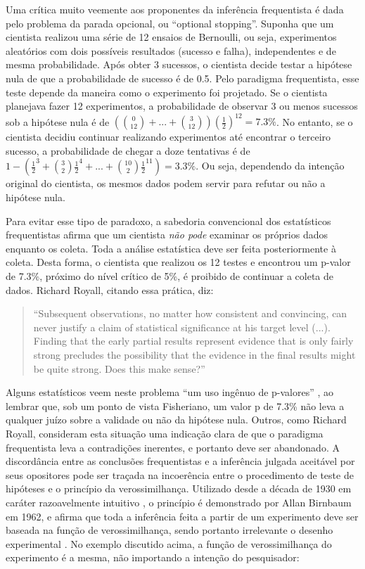 Uma crítica muito veemente aos proponentes da inferência frequentista é dada pelo problema da parada opcional, ou 
``optional stopping''. Suponha que um cientista realizou uma série de 12 ensaios de Bernoulli, ou seja, experimentos aleatórios
com dois possíveis resultados (sucesso e falha), independentes e de mesma probabilidade. Após obter 3 sucessos, o cientista
decide testar a hipótese nula de que a probabilidade de sucesso é de 0.5. Pelo paradigma frequentista, esse teste depende
da maneira como o experimento foi projetado. Se o cientista planejava fazer 12 experimentos, a probabilidade de observar 3
ou menos sucessos sob a hipótese nula é de $ \left( {0 \choose 12} + ... + {3 \choose 12}\right) (\frac{1}{2})^{12} = 7.3\%$. 
No entanto, se o cientista decidiu continuar realizando experimentos até
encontrar o terceiro sucesso, a probabilidade de chegar a doze tentativas é de 
$1 - \left( \frac{1}{2}^3 + {3 \choose 2} \frac{1}{2}^4 + ... + {10 \choose 2} \frac{1}{2}^{11}\right) = 3.3\%$. Ou seja,
dependendo da intenção original do cientista, os mesmos dados podem servir para refutar ou não a hipótese nula.

Para evitar esse tipo de  paradoxo, a sabedoria convencional dos estatísticos frequentistas afirma que um cientista {\em não pode}
examinar os próprios dados enquanto os coleta. Toda a análise estatística deve ser feita posteriormente à coleta. 
Desta forma, o cientista que realizou os 12 testes e encontrou um p-valor de 7.3\%, próximo do nível crítico de 5\%, é
proibido de continuar a coleta de dados. Richard Royall, citando essa prática, diz:

\begin{quote}
``Subsequent observations, no matter how consistent and convincing, can never justify a claim of statistical significance
at his target level (...). Finding that the early partial results represent evidence that is only fairly strong precludes
the possibility that the evidence in the final results might be quite strong. Does this make sense?'' \citep{Royall97}
\end{quote}

Alguns estatísticos veem neste problema ``um uso ingênuo de p-valores'' \citep{Good92}, ao lembrar que, sob um
ponto de vista Fisheriano, um valor p de 7.3\% não leva a qualquer juízo sobre a validade ou não da hipótese nula.
Outros, como Richard Royall,
consideram esta situação uma indicação clara de que o paradigma frequentista leva a contradições inerentes, e portanto 
deve ser abandonado. A discordância entre as conclusões frequentistas e a inferência julgada aceitável por seus opositores 
pode ser traçada na incoerência entre
o procedimento de teste de hipóteses e o princípio da verossimilhança. Utilizado desde a década de 1930 
em caráter razoavelmente intuitivo \cite{Neyman1933}, o princípio é demonstrado por Allan Birnbaum em 1962, 
e afirma que toda a inferência feita a partir de um experimento deve ser baseada na função de verossimilhança,
sendo portanto irrelevante o desenho experimental \citep{Birnbaum62}. 
No exemplo discutido acima, a função de verossimilhança do experimento é a mesma, não importando a intenção do pesquisador:

